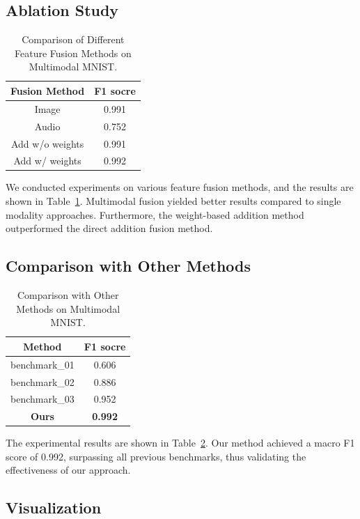 \documentclass{article}
\begin{document}
\subsection{Ablation Study}

\begin{table}[!htb]
	\caption{Comparison of Different Feature Fusion Methods on Multimodal MNIST.}
	\label{tab:ablation}
	\centering
	\begin{tabular}{c|c}
		\toprule
		Fusion Method        & F1 socre \\
		\midrule
		Image & 0.991    \\
		Audio & 0.752    \\
		Add w/o weights & 0.991    \\
		Add w/ weights & 0.992   \\
		\bottomrule
	\end{tabular}
\end{table}

We conducted experiments on various feature fusion methods, and the results are shown in Table~\ref{tab:ablation}. Multimodal fusion yielded better results compared to single modality approaches. Furthermore, the weight-based addition method outperformed the direct addition fusion method.

\subsection{Comparison with Other Methods}

\begin{table}[!htb]
	\caption{Comparison with Other Methods on Multimodal MNIST.}
	\label{tab:result}
	\centering
	\begin{tabular}{c|c}
		\toprule
		Method        & F1 socre \\
		\midrule
		benchmark\_01 & 0.606    \\
		benchmark\_02 & 0.886    \\
		benchmark\_03 & 0.952    \\
		\midrule
		\textbf{Ours}          & \textbf{0.992}   \\
		\bottomrule
	\end{tabular}
\end{table}

The experimental results are shown in Table~\ref{tab:result}. Our method achieved a macro F1 score of 0.992, surpassing all previous benchmarks, thus validating the effectiveness of our approach.

\subsection{Visualization}
\end{document}
